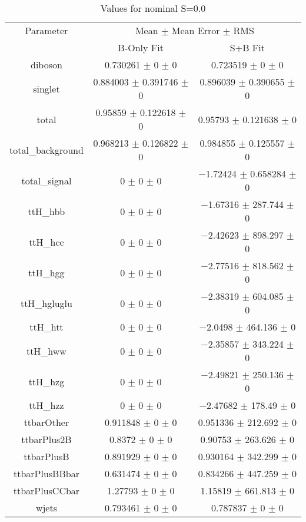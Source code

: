 \begin{table}
\centering
\caption{Values for nominal S=0.0}
\begin{tabular}{ccc}
\toprule
Parameter & \multicolumn{2}{c}{Mean $\pm$ Mean Error $\pm$ RMS}\\
 & B-Only Fit & S+B Fit\\
\midrule
diboson & \num{0.730261} $\pm$ \num{0} $\pm$ \num{0} & \num{0.723519} $\pm$ \num{0} $\pm$ \num{0}\\
singlet & \num{0.884003} $\pm$ \num{0.391746} $\pm$ \num{0} & \num{0.896039} $\pm$ \num{0.390655} $\pm$ \num{0}\\
total & \num{0.95859} $\pm$ \num{0.122618} $\pm$ \num{0} & \num{0.95793} $\pm$ \num{0.121638} $\pm$ \num{0}\\
total\_background & \num{0.968213} $\pm$ \num{0.126822} $\pm$ \num{0} & \num{0.984855} $\pm$ \num{0.125557} $\pm$ \num{0}\\
total\_signal & \num{0} $\pm$ \num{0} $\pm$ \num{0} & \num{-1.72424} $\pm$ \num{0.658284} $\pm$ \num{0}\\
ttH\_hbb & \num{0} $\pm$ \num{0} $\pm$ \num{0} & \num{-1.67316} $\pm$ \num{287.744} $\pm$ \num{0}\\
ttH\_hcc & \num{0} $\pm$ \num{0} $\pm$ \num{0} & \num{-2.42623} $\pm$ \num{898.297} $\pm$ \num{0}\\
ttH\_hgg & \num{0} $\pm$ \num{0} $\pm$ \num{0} & \num{-2.77516} $\pm$ \num{818.562} $\pm$ \num{0}\\
ttH\_hgluglu & \num{0} $\pm$ \num{0} $\pm$ \num{0} & \num{-2.38319} $\pm$ \num{604.085} $\pm$ \num{0}\\
ttH\_htt & \num{0} $\pm$ \num{0} $\pm$ \num{0} & \num{-2.0498} $\pm$ \num{464.136} $\pm$ \num{0}\\
ttH\_hww & \num{0} $\pm$ \num{0} $\pm$ \num{0} & \num{-2.35857} $\pm$ \num{343.224} $\pm$ \num{0}\\
ttH\_hzg & \num{0} $\pm$ \num{0} $\pm$ \num{0} & \num{-2.49821} $\pm$ \num{250.136} $\pm$ \num{0}\\
ttH\_hzz & \num{0} $\pm$ \num{0} $\pm$ \num{0} & \num{-2.47682} $\pm$ \num{178.49} $\pm$ \num{0}\\
ttbarOther & \num{0.911848} $\pm$ \num{0} $\pm$ \num{0} & \num{0.951336} $\pm$ \num{212.692} $\pm$ \num{0}\\
ttbarPlus2B & \num{0.8372} $\pm$ \num{0} $\pm$ \num{0} & \num{0.90753} $\pm$ \num{263.626} $\pm$ \num{0}\\
ttbarPlusB & \num{0.891929} $\pm$ \num{0} $\pm$ \num{0} & \num{0.930164} $\pm$ \num{342.299} $\pm$ \num{0}\\
ttbarPlusBBbar & \num{0.631474} $\pm$ \num{0} $\pm$ \num{0} & \num{0.834266} $\pm$ \num{447.259} $\pm$ \num{0}\\
ttbarPlusCCbar & \num{1.27793} $\pm$ \num{0} $\pm$ \num{0} & \num{1.15819} $\pm$ \num{661.813} $\pm$ \num{0}\\
wjets & \num{0.793461} $\pm$ \num{0} $\pm$ \num{0} & \num{0.787837} $\pm$ \num{0} $\pm$ \num{0}\\
\bottomrule
\end{tabular}
\end{table}